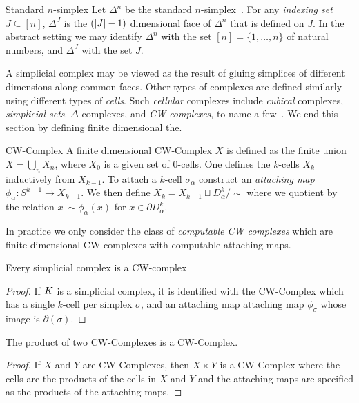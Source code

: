 \begin{definition}{Standard $n$-simplex}
Let $\Delta^n$ be the standard $n$-simplex~\cite{hatcher}. For any
\emph{indexing set} $J \subseteq [n]$, $\Delta^J$ is the $(|J|-1)$ 
dimensional face of $\Delta^n$  that is defined on $J$. In the abstract setting we may
identify $\Delta^n$ with the set $[n] = \{1, \ldots, n\}$ of natural numbers, and $\Delta^J$ with the set $J$.
\end{definition}
A simplicial complex may be viewed as the result of gluing simplices of 
different dimensions along common faces. Other types of complexes are defined 
similarly using different types of \emph{cells}. Such \emph{cellular} complexes include \emph{cubical} complexes, \emph{simplicial sets}. $\Delta$-complexes, and \emph{CW-complexes}, 
to name a few~\cite{ez-ssc-50,hatcher,kmm-ch-04,m-soat-68}. We end this section by defining finite dimensional the.

\begin{definition}{CW-Complex}
 A finite dimensional CW-Complex $X$ is defined as the finite union $X = \bigcup_n X_n$, where $X_0$ is a given set of $0$-cells. One defines the $k$-cells $X_k$ inductively from $X_{k-1}$. To attach a $k$-cell $\sigma_\alpha$ construct an \emph{attaching map} $\phi_\alpha: S^{k-1} \rightarrow X_{k-1}$. We then define $X_k = X_{k-1} \sqcup D^k_\alpha / \sim$ where we quotient by the relation $x ~\sim \phi_\alpha(x)$ for $x \in \partial D^k_\alpha$. 
\end{definition}
In practice we only consider the class of  \emph{computable CW complexes} which are finite dimensional CW-complexes with computable attaching maps.
\begin{lemma}
Every simplicial complex is a CW-complex
\label{lem:simp-is-cw}
\end{lemma}
\begin{proof}
If $K$ is a simplicial complex, it is identified with the CW-Complex which has a single $k$-cell per simplex $\sigma$, and an attaching map attaching map $\phi_\sigma$ whose image is $\partial(\sigma)$.  
\end{proof}
\begin{lemma}
The product of two CW-Complexes is a CW-Complex.
\label{lem:cw-complex-product}
\end{lemma}
\begin{proof}
If $X$ and $Y$ are CW-Complexes, then $X \times Y$ is a CW-Complex where the cells are the products of the cells in $X$ and $Y$ and the attaching maps are specified as the products of the attaching maps.
\end{proof}

